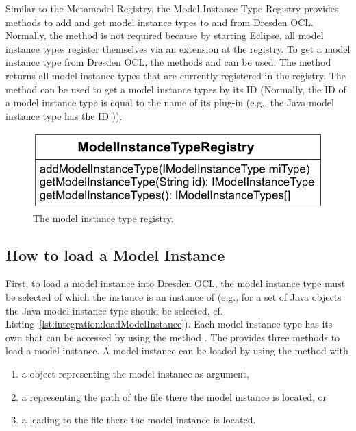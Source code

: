 Similar to the Metamodel Registry, the Model Instance Type Registry provides 
methods to add and get model instance types to and from Dresden OCL. Normally,
the method 
is not required because by starting Eclipse, all model instance types register
themselves via an extension at the registry. To get a model instance type from
Dresden OCL, the methods  and
 can be used. The method 
 returns all model instance types that are
currently registered in the registry. The method  can be used to get a model instance types by its ID (Normally, the ID 
of a model instance type is equal to the name of its plug-in (e.g., the Java 
model instance type has the ID )).

\begin{figure}[!b]
	\centering
	\includegraphics[width=.7\linewidth]{figures/integration/modelInstanceTypeRegistry}
	\caption{The model instance type registry.}
	\label{pic:integration:modelInstanceTypeRegistry}
\end{figure}


\subsection{How to load a Model Instance}

First, to load a model instance into Dresden OCL, the model instance type must
be selected of which the instance is an instance of (e.g., for a set of Java
objects the Java model instance type should be selected, cf. 
Listing~\ref{lst:integration:loadModelInstance}). Each model instance type has
its own  that can be accessed by using the
method . The
 provides three methods to load a model instance.
A model instance can be loaded by using the method  
with

\begin{enumerate}
	\item a  object representing the model instance as argument,
	\item a  representing the path of the file there the model
	  instance is located, or
	\item a  leading to the file there the model instance is located.
\end{enumerate}

